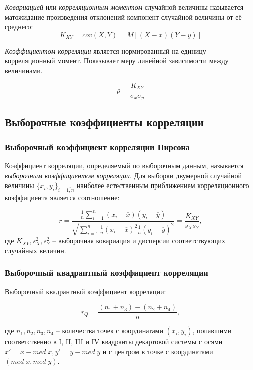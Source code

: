 \documentclass[12pt]{article}
\begin{document}
\textit{Ковариацией} или \textit{корреляционным моментом} случайной величины называется матожидание произведения отклонений компонент случайной величины от её среднего:
\begin{equation}\label{K}
	K_{XY} = cov(X, Y) = M[(X - \overline{x})(Y - \overline{y})]
\end{equation}

\textit{Коэффициентом корреляции} является нормированный на единицу корреляционный момент. Показывает меру линейной зависимости между величинами. \cite{lit1}

\begin{equation}\label{rho}
	\rho = \frac{K_{XY}}{\sigma_x \sigma_y}
\end{equation}

\subsection{Выборочные коэффициенты корреляции}
\subsubsection{Выборочный коэффициент корреляции Пирсона}
Коэффициент корреляции, определяемый по выборочным данным, называется {\it выборочным коэффициентом корреляции}.
Для выборки двумерной случайной величины $\{x_i, y_i\}_{i=\overline{1,n}}$ наиболее естественным приближением корреляционного коэффициента является соотношение:

\begin{equation}\label{r}
	r = \frac{\frac{1}{n} \displaystyle \sum_{i=1}^{n}{\left(x_i - \overline{x}\right)\left(y_i - \overline{y}\right)}}{\sqrt{\displaystyle \sum_{i=1}^{n}{\frac{1}{n}\left(x_i - \overline{x}\right)^2\frac{1}{n}\left(y_i - \overline{y}\right)^2}}} = \frac{K_{XY}}{s_X s_Y},
\end{equation}
где $K_{XY}, s_X^2, s_Y^2$ -- выборочная ковариация и дисперсии соответствующих случайных величин. \cite{lit1}

\subsubsection{Выборочный квадрантный коэффициент корреляции}
Выборочный квадрантный коэффициент корреляции:

\begin{equation}\label{rq}
	r_Q=\frac{(n_1 + n_3) - (n_2 + n_4)}{n},
\end{equation}

где $n_1, n_2, n_3, n_4$ -- количества точек с координатами $(x_i, y_i)$, попавшими соответственно в I, II, III и IV квадранты декартовой системы с осями $x' = x - med \; x, y' = y - med \; y$ и с центром в точке с координатами $(med \; x, med \; y)$. \cite{lit1}
\end{document}
